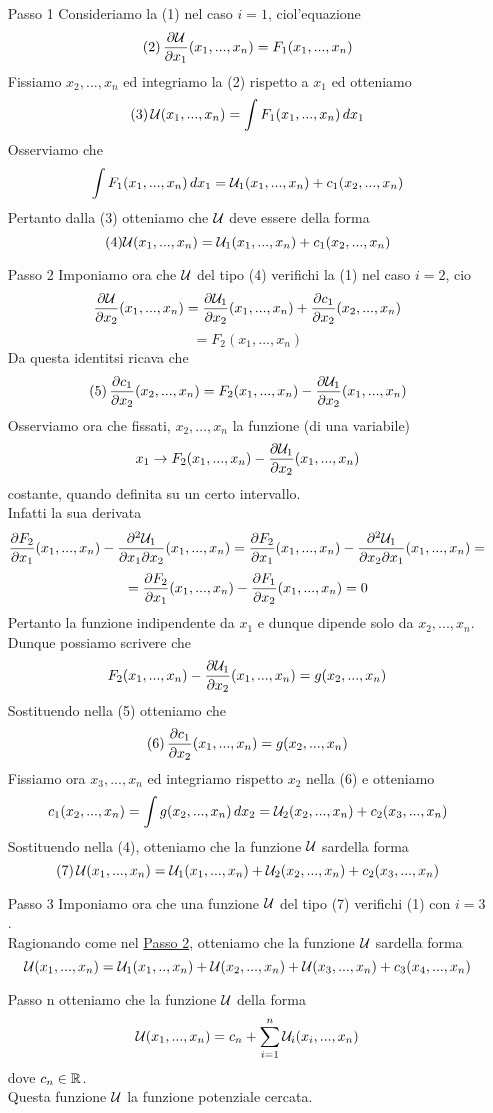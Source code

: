 \begin{enumerate}
  \item[Passo 1] 
        Consideriamo la (1) nel caso $i=1$, cio\ace l'equazione
        $$(2) \, \frac{\partial\mathcal{U}}{\partial x_1}(x_1,...,x_n) = F_1(x_1,...,x_n)$$
        Fissiamo $x_2,...,x_n$ ed integriamo la (2) rispetto a $x_1$ ed otteniamo
        $$(3)\, \mathcal{U}(x_1,...,x_n) = \int F_1(x_1,...,x_n)\,dx_1$$
        Osserviamo che 
        $$\int F_1(x_1,...,x_n)\,dx_1 = \mathcal{U}_1(x_1,...,x_n) + c_1 (x_2,...,x_n)$$
        Pertanto dalla (3) otteniamo che $\mathcal{U}$ deve essere della forma 
        $$(4) \mathcal{U}(x_1,...,x_n) = \mathcal{U}_1(x_1,...,x_n)+c_1(x_2,...,x_n)$$
  \item[Passo 2]
        Imponiamo  ora che $\mathcal{U}$ del tipo (4) verifichi la (1) nel caso $i=2$, cio\ace 
        $$\frac{\partial\mathcal{U}}{\partial x_2}(x_1,...,x_n) = \frac{\partial\mathcal{U}_1}{\partial x_2}(x_1,...,x_n) + \frac{\partial c_1}{\partial x_2}(x_2,...,x_n)$$
        $$= F_2(x_1,...,x_n)$$
        Da questa identit\aca si ricava che 
        $$(5) \, \frac{\partial c_1}{\partial x_2}(x_2,...,x_n) = F_2(x_1,...,x_n) - \frac{\partial\mathcal{U}_1}{\partial x_2}(x_1,...,x_n)$$
        Osserviamo ora che fissati, $x_2,...,x_n$ la funzione (di una variabile)
        $$x_1 \to F_2(x_1,...,x_n) - \frac{\partial\mathcal{U}_1}{\partial x_2}(x_1,...,x_n)$$
        \ace costante, quando \ace definita su un certo intervallo. \\
        Infatti la sua derivata 
        $$\frac{\partial F_2}{\partial x_1} (x_1,...,x_n) - \frac{\partial^2\mathcal{U}_1}{\partial x_1 \partial x_2}(x_1,...,x_n) = 
        \frac{\partial F_2}{\partial x_1} (x_1,...,x_n) - \frac{\partial^2\mathcal{U}_1}{\partial x_2 \partial x_1}(x_1,...,x_n) = $$
        $$= \frac{\partial F_2}{\partial x_1} (x_1,...,x_n) - \frac{\partial F_1}{\partial x_2}(x_1,...,x_n) = 0$$
        Pertanto la funzione \ace indipendente da $x_1$ e dunque dipende solo da $x_2,...,x_n$. \\
        Dunque possiamo scrivere che 
        $$F_2 (x_1,...,x_n) - \frac{\partial\mathcal{U}_1}{ \partial x_2}(x_1,...,x_n) = g(x_2,...,x_n)$$
        Sostituendo nella (5) otteniamo che 
        $$(6) \, \frac{\partial c_1}{\partial x_2}(x_1,...,x_n) = g(x_2,...,x_n)$$
        Fissiamo ora $x_3,...,x_n$ ed integriamo rispetto $x_2$ nella (6) e otteniamo
        $$c_1(x_2,...,x_n) = \int g(x_2,...,x_n) \, dx_2 = \mathcal{U}_2(x_2,...,x_n) + c_2(x_3,...,x_n)$$
        Sostituendo nella (4), otteniamo che la funzione $\mathcal{U}$ sar\aca della forma 
        $$(7) \, \mathcal{U}(x_1,...,x_n) = \mathcal{U}_1 (x_1,...,x_n) + \mathcal{U}_2(x_2,...,x_n) + c_2(x_3,...,x_n)$$
  \item[Passo 3]
        Imponiamo ora che una funzione $\mathcal{U}$ del tipo (7) verifichi (1) con $i=3$. \\
        Ragionando come nel \underline{Passo 2}, otteniamo che la funzione $\mathcal{U}$ sar\aca della forma 
        $$\mathcal{U}(x_1,...,x_n) = \mathcal{U}_1(x_1,..,x_n) + \mathcal{U}(x_2,...,x_n) + \mathcal{U}(x_3,...,x_n) + c_3(x_4,...,x_n)$$
  \item[Passo n]
        otteniamo che la funzione $\mathcal{U}$ \ace della forma 
        $$\mathcal{U}(x_1,...,x_n) = c_n + \sum_{i=1}^{n} \mathcal{U}_i(x_i,...,x_n)$$
        dove $c_n \in \mathbb{R}$. \\
        Questa funzione $\mathcal{U}$ \ace la funzione potenziale cercata.
\end{enumerate}
